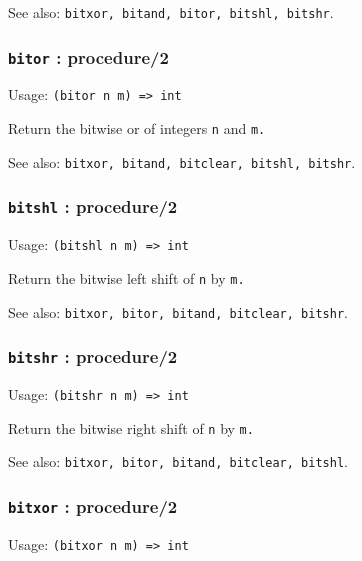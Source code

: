 \documentclass[
]{article}
\newcommand{\passthrough}[1]{#1}
\begin{document}
See also:
\passthrough{\lstinline!bitxor, bitand, bitor, bitshl, bitshr!}.

\hypertarget{bitor-procedure2}{%
\subsubsection{\texorpdfstring{\texttt{bitor} :
procedure/2}{bitor : procedure/2}}\label{bitor-procedure2}}

Usage: \passthrough{\lstinline!(bitor n m) => int!}

Return the bitwise or of integers \passthrough{\lstinline!n!} and
\passthrough{\lstinline!m.!}

See also:
\passthrough{\lstinline!bitxor, bitand, bitclear, bitshl, bitshr!}.

\hypertarget{bitshl-procedure2}{%
\subsubsection{\texorpdfstring{\texttt{bitshl} :
procedure/2}{bitshl : procedure/2}}\label{bitshl-procedure2}}

Usage: \passthrough{\lstinline!(bitshl n m) => int!}

Return the bitwise left shift of \passthrough{\lstinline!n!} by
\passthrough{\lstinline!m.!}

See also:
\passthrough{\lstinline!bitxor, bitor, bitand, bitclear, bitshr!}.

\hypertarget{bitshr-procedure2}{%
\subsubsection{\texorpdfstring{\texttt{bitshr} :
procedure/2}{bitshr : procedure/2}}\label{bitshr-procedure2}}

Usage: \passthrough{\lstinline!(bitshr n m) => int!}

Return the bitwise right shift of \passthrough{\lstinline!n!} by
\passthrough{\lstinline!m.!}

See also:
\passthrough{\lstinline!bitxor, bitor, bitand, bitclear, bitshl!}.

\hypertarget{bitxor-procedure2}{%
\subsubsection{\texorpdfstring{\texttt{bitxor} :
procedure/2}{bitxor : procedure/2}}\label{bitxor-procedure2}}

Usage: \passthrough{\lstinline!(bitxor n m) => int!}
\end{document}
